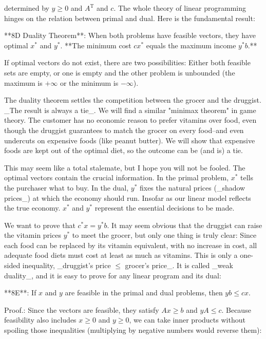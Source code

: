 determined by \(y\geq 0\) and \(A^{\mathrm{T}}\) and \(c\). The whole theory of linear programming hinges on the relation between primal and dual. Here is the fundamental result:

**8D Duality Theorem**: When both problems have feasible vectors, they have optimal \(x^{*}\) and \(y^{*}\). **The minimum cost \(cx^{*}\) equals the maximum income \(y^{*}b\).**

If optimal vectors do not exist, there are two possibilities: Either both feasible sets are empty, or one is empty and the other problem is unbounded (the maximum is \(+\infty\) or the minimum is \(-\infty\)).

The duality theorem settles the competition between the grocer and the druggist. _The result is always a tie_. We will find a similar "minimax theorem" in game theory. The customer has no economic reason to prefer vitamins over food, even though the druggist guarantees to match the grocer on every food--and even undercuts on expensive foods (like peanut butter). We will show that expensive foods are kept out of the optimal diet, so the outcome can be (and is) a tie.

This may seem like a total stalemate, but I hope you will not be fooled. The optimal vectors contain the crucial information. In the primal problem, \(x^{*}\) tells the purchaser what to buy. In the dual, \(y^{*}\) fixes the natural prices (_shadow prices_) at which the economy should run. Insofar as our linear model reflects the true economy. \(x^{*}\) and \(y^{*}\) represent the essential decisions to be made.

We want to prove that \(c^{*}x=y^{*}b\). It may seem obvious that the druggist can raise the vitamin prices \(y^{*}\) to meet the grocer, but only one thing is truly clear: Since each food can be replaced by its vitamin equivalent, with no increase in cost, all adequate food diets must cost at least as much as vitamins. This is only a one-sided inequality, _druggist's price \(\leq\) grocer's price_. It is called _weak duality_, and it is easy to prove for any linear program and its dual:

**8E**: If \(x\) and \(y\) are feasible in the primal and dual problems, then \(yb\leq cx\).

Proof.: Since the vectors are feasible, they satisfy \(Ax\geq b\) and \(yA\leq c\). Because feasibility also includes \(x\geq 0\) and \(y\geq 0\), we can take inner products without spoiling those inequalities (multiplying by negative numbers would reverse them):

